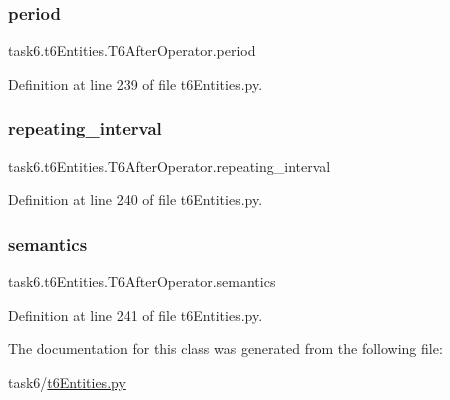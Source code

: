 \subsubsection{\texorpdfstring{period}{period}}
{\footnotesize\ttfamily task6.\+t6\+Entities.\+T6\+After\+Operator.\+period}



Definition at line 239 of file t6\+Entities.\+py.

\mbox{\label{classtask6_1_1t6Entities_1_1T6AfterOperator_aa3611005a94f1cbc3867c3e3c9463d24}} 
\subsubsection{\texorpdfstring{repeating\+\_\+interval}{repeating\_interval}}
{\footnotesize\ttfamily task6.\+t6\+Entities.\+T6\+After\+Operator.\+repeating\+\_\+interval}



Definition at line 240 of file t6\+Entities.\+py.

\mbox{\label{classtask6_1_1t6Entities_1_1T6AfterOperator_a9a0d8b1907a272fa065b80fdd8a533a8}} 
\subsubsection{\texorpdfstring{semantics}{semantics}}
{\footnotesize\ttfamily task6.\+t6\+Entities.\+T6\+After\+Operator.\+semantics}



Definition at line 241 of file t6\+Entities.\+py.



The documentation for this class was generated from the following file\+:\begin{DoxyCompactItemize}
\item 
task6/\hyperlink{t6Entities_8py}{t6\+Entities.\+py}\end{DoxyCompactItemize}
